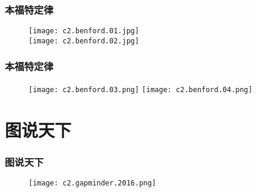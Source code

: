\begin{frame}
  \frametitle{本福特定律}
  \begin{figure}
    \centering
    \texttt{[image: c2.benford.01.jpg]}\\
    \texttt{[image: c2.benford.02.jpg]}
  \end{figure}
\end{frame}

\begin{frame}
  \frametitle{本福特定律}
  \begin{figure}
    \centering
    \texttt{[image: c2.benford.03.png]}
    \texttt{[image: c2.benford.04.png]}
  \end{figure}
\end{frame}

\section{图说天下}
\begin{frame}
  \frametitle{图说天下}
  \begin{figure}
    \centering
    \texttt{[image: c2.gapminder.2016.png]}
  \end{figure}
\end{frame}


